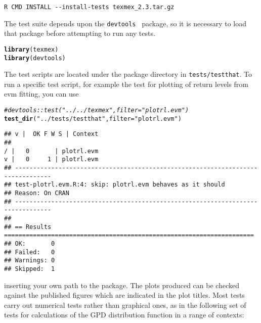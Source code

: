\documentclass[a4paper]{article}\usepackage[]{graphicx}\usepackage[]{color}
\makeatletter
\newcommand{\hlstr}[1]{\textcolor[rgb]{0.192,0.494,0.8}{#1}}%
\newcommand{\hlcom}[1]{\textcolor[rgb]{0.678,0.584,0.686}{\textit{#1}}}%
\newcommand{\hlstd}[1]{\textcolor[rgb]{0.345,0.345,0.345}{#1}}%
\newcommand{\hlkwc}[1]{\textcolor[rgb]{0.333,0.667,0.333}{#1}}%
\newcommand{\hlkwd}[1]{\textcolor[rgb]{0.737,0.353,0.396}{\textbf{#1}}}%
\newenvironment{kframe}{%
 \def\at@end@of@kframe{}%
 \ifinner\ifhmode%
  \def\at@end@of@kframe{\end{minipage}}%
  \begin{minipage}{\columnwidth}%
 \fi\fi%
 \def\FrameCommand##1{\hskip\@totalleftmargin \hskip-\fboxsep
 \colorbox{shadecolor}{##1}\hskip-\fboxsep
     \hskip-\linewidth \hskip-\@totalleftmargin \hskip\columnwidth}%
 \MakeFramed {\advance\hsize-\width
   \@totalleftmargin\z@ \linewidth\hsize
   \@setminipage}}%
 {\par\unskip\endMakeFramed%
 \at@end@of@kframe}
\newenvironment{knitrout}{}{} %
\makeatother
\begin{document}
\begin{verbatim}
R CMD INSTALL --install-tests texmex_2.3.tar.gz
\end{verbatim}

The test suite depends upon the {\tt devtools}~\cite{devtools} package, so it is
necessary to load that package before attempting to run any tests.

\begin{knitrout}
\color{fgcolor}\begin{kframe}
\begin{alltt}
\hlkwd{library}\hlstd{(texmex)}
\hlkwd{library}\hlstd{(devtools)}
\end{alltt}
\end{kframe}
\end{knitrout}

The test scripts are located under the package directory in {\tt tests/testthat}.
To run a specific test script, for example the test for plotting of return levels from evm fitting, you can use

\begin{knitrout}
\color{fgcolor}\begin{kframe}
\begin{alltt}
\hlcom{#devtools::test("../../texmex",filter="plotrl.evm")}
\hlkwd{test_dir}\hlstd{(}\hlstr{"../tests/testthat"}\hlstd{,} \hlkwc{filter}\hlstd{=}\hlstr{"plotrl.evm"}\hlstd{)}
\end{alltt}
\begin{verbatim}
## v |  OK F W S | Context
## 
/ |   0       | plotrl.evm
v |   0     1 | plotrl.evm
## --------------------------------------------------------------------------------
## test-plotrl.evm.R:4: skip: plotrl.evm behaves as it should
## Reason: On CRAN
## --------------------------------------------------------------------------------
## 
## == Results =====================================================================
## OK:       0
## Failed:   0
## Warnings: 0
## Skipped:  1
\end{verbatim}
\end{kframe}
\end{knitrout}

inserting your own path to the package.  The plots produced can be checked against the published figures which are indicated in the plot titles.  Most tests carry out numerical tests rather than graphical ones, as in the following set of tests for calculations of the GPD distribution function in a range of contexts:
\end{document}
